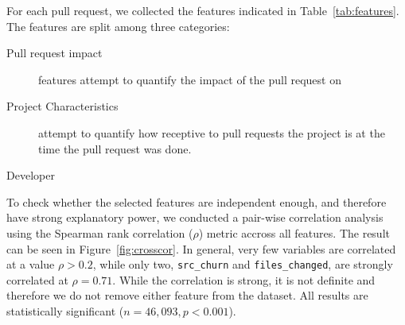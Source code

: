 \documentclass{sig-alternate}
\begin{document}
For each pull request, we collected the features indicated in
Table~\ref{tab:features}. The features are split among three
categories:

\begin{description}

  \item[Pull request impact] features attempt to quantify the impact of
    the pull request on

  \item[Project Characteristics] attempt to quantify how receptive to
    pull requests the project is at the time the pull request was done.

  \item[Developer] 

\end{description}

To check whether the selected features are independent enough, and therefore
have strong explanatory power, we conducted a pair-wise correlation analysis
using the Spearman rank correlation ($\rho$) metric accross all features.  The
result can be seen in Figure~\ref{fig:crosscor}.  In general, very few
variables are correlated at a value $\rho > 0.2$, while only two,
\texttt{src\_churn} and \texttt{files\_changed}, are strongly correlated at
$\rho = 0.71$. While the correlation is strong, it is not definite and therefore
we do not remove either feature from the dataset. All results are statistically significant ($n = 46,093, p < 0.001$).
\end{document}
